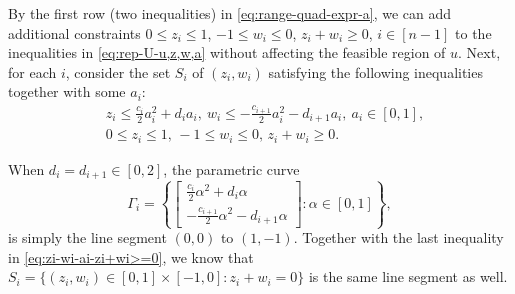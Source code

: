 	By the first row (two inequalities) in \eqref{eq:range-quad-expr-a}, we can add additional constraints 
	$0\leq z_i \leq 1$, $-1 \leq w_i\leq 0$, $z_i + w_i \geq 0$, $i\in [n-1]$
	to the inequalities in \eqref{eq:rep-U-u,z,w,a} without affecting the feasible region of $u$. 
	Next, for each $i$, consider the set $S_i$ of $(z_i, w_i)$ satisfying the following inequalities together with some $a_i$:
	\begin{align}
		& z_i \leq \frac{c_i}{2}a_i^2 + d_i a_i,\ w_i \leq - \frac{c_{i+1}}{2} a_i^2 - d_{i+1} a_i,\ a_i \in [0,1], \nonumber \\
		& 0\leq z_i\leq 1, \, -1\leq w_i \leq 0,\, z_i + w_i \geq 0.
		\label{eq:zi-wi-ai-zi+wi>=0}
	\end{align}
	
	When $d_i = d_{i+1} \in [0,2]$, the parametric curve
	\[ \Gamma_i = \left\{ \begin{bmatrix}
		\frac{c_i}{2} \alpha^2 + d_i \alpha \\
		-\frac{c_{i+1}}{2} \alpha^2 - d_{i+1} \alpha
	\end{bmatrix}: \alpha \in [0,1] \right\}, 
	\]
	is simply the line segment $(0,0)$ to $(1,-1)$. Together with the last inequality in \eqref{eq:zi-wi-ai-zi+wi>=0}, we know that
	$ S_i = \{ (z_i, w_i)\in [0,1]\times [-1, 0]: z_i + w_i = 0 \}$
	is the same line segment as well.

